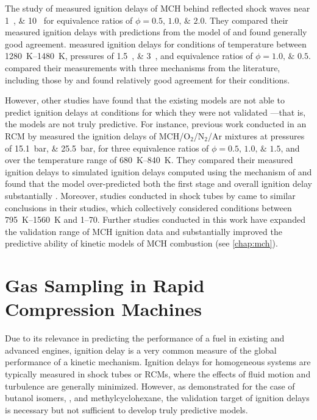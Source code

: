 \documentclass[../main.tex]{subfiles}
\begin{document}
The study of \textcite{Rotavera2013} measured ignition delays of MCH behind
reflected shock waves near \SIlist{1;10}{\atmosphere} for equivalence
ratios of $\phi = \numlist{0.5;1.0;2.0}$. They compared their measured ignition
delays with predictions from the model of \textcite{Pitz2007} and found
generally good agreement. \textcite{Hong2011} measured ignition delays
for conditions of temperature between \SIrange{1280}{1480}{\kelvin}, pressures
of \SIlist{1.5;3}{\atmosphere}, and equivalence ratios of $\phi = \numlist{1.0;0.5}$.
\textcite{Hong2011} compared their measurements with three mechanisms
from the literature, including those by \textcite{Pitz2007, Orme2006}
and found relatively good agreement for their conditions.

However, other studies have found that the existing models are not able
to predict ignition delays at conditions for which they were not validated%
---that is, the models are not truly predictive. For instance, previous work
conducted in an RCM by \textcite{Mittal2009} measured the ignition delays
of MCH/O$_2$/N$_2$/Ar mixtures at pressures of \SIlist{15.1;25.5}{\bar},
for three equivalence ratios of $\phi = \numlist{0.5;1.0;1.5}$, and over
the temperature range of \SIrange{680}{840}{\kelvin}. They compared
their measured ignition delays to simulated ignition delays computed
using the mechanism of \textcite{Pitz2007} and found that the model
over-predicted both the first stage and overall ignition delay substantially
\cite{Mittal2009}. Moreover, studies conducted in shock tubes by
\textcite{Vasu2009, Vanderover2009} came to similar conclusions in their
studies, which collectively considered conditions between \SIrange{795}{1560}{\kelvin}
and \SIrange{1}{70}{\atmosphere}. Further studies conducted in this work
have expanded the validation range of MCH ignition data and substantially
improved the predictive ability of kinetic models of MCH combustion (see
\cref{chap:mch}).

\section{Gas Sampling in Rapid Compression Machines}

Due to its relevance in predicting the performance of a fuel in existing
and advanced engines, ignition delay is a very common measure of the
global performance of a kinetic mechanism. Ignition delays for homogeneous
systems are typically measured in shock tubes or RCMs, where the effects
of fluid motion and turbulence are generally minimized. However, as demonstrated
for the case of butanol isomers, \iPeOH{}, and methylcyclohexane, the
validation target of ignition delays is necessary but not sufficient to
develop truly predictive models.
\end{document}
